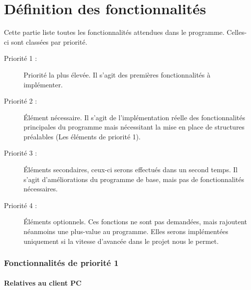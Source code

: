 \part{Définition des fonctionnalités}
Cette partie liste toutes les fonctionnalités attendues dans le programme. Celles-ci sont classées par priorité.

\begin{description}
\item [Priorité 1 :]
	Priorité la plus élevée. Il s'agit des premières fonctionnalités à implémenter.

\item [Priorité 2 :]
	Élément nécessaire. Il s'agit de l'implémentation réelle des fonctionnalités principales du programme mais nécessitant la mise en place de structures préalables (Les éléments de priorité 1). 

\item [Priorité 3 :]
	Éléments secondaires, ceux-ci serons effectués dans un second temps. Il s'agit d'améliorations du programme de base, mais pas de fonctionnalités nécessaires.  

\item [Priorité 4 :]
	Éléments optionnels. Ces fonctions ne sont pas demandées, mais rajoutent néanmoins une plus-value au programme. Elles serons implémentées uniquement si la vitesse d'avancée dans le projet nous le permet.
\end{description}


\section{Fonctionnalités de priorité 1}


\subsection{Relatives au client PC}

